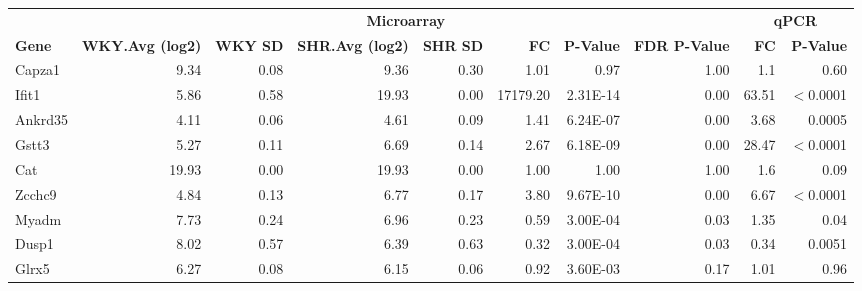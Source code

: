 \begin{sidewaystable}[!htbp]
\scriptsize
\centering
\begin{tabular}{lrrrrrrr|rr}
\textbf{}            & \multicolumn{7}{c}{\textbf{Microarray}}                                                                                                             & \multicolumn{2}{c}{\textbf{qPCR}}\\
\textbf{Gene} & \textbf{WKY.Avg (log2)} & \textbf{WKY SD} & \textbf{SHR.Avg (log2)} & \textbf{SHR SD} & \textbf{FC} & \textbf{P-Value} & \textbf{FDR P-Value}  & \textbf{FC}  & \textbf{P-Value}\\
\hline
Capza1               & 9.34                    & 0.08            & 9.36                    & 0.30            & 1.01                 & 0.97           & 1.00                & 1.1   & 0.60 \\
Ifit1                & 5.86                    & 0.58            & 19.93                   & 0.00            & 17179.20             & 2.31E-14       & 0.00                & 63.51 & $<$0.0001 \\
Ankrd35              & 4.11                    & 0.06            & 4.61                    & 0.09            & 1.41                 & 6.24E-07       & 0.00                & 3.68  & 0.0005\\
Gstt3                & 5.27                    & 0.11            & 6.69                    & 0.14            & 2.67                 & 6.18E-09       & 0.00                & 28.47 & $<$0.0001\\
Cat                  & 19.93                   & 0.00            & 19.93                   & 0.00            & 1.00                 & 1.00           & 1.00                & 1.6   & 0.09\\
Zcchc9               & 4.84                    & 0.13            & 6.77                    & 0.17            & 3.80                 & 9.67E-10       & 0.00                & 6.67  & $<$0.0001\\
\hline
Myadm                & 7.73                    & 0.24            & 6.96                    & 0.23            & 0.59                 & 3.00E-04       & 0.03                & 1.35  & 0.04\\
Dusp1                & 8.02                    & 0.57            & 6.39                    & 0.63            & 0.32                 & 3.00E-04       & 0.03                & 0.34  & 0.0051\\
Glrx5                & 6.27                    & 0.08            & 6.15                    & 0.06            & 0.92                 & 3.60E-03       & 0.17                & 1.01  & 0.96\\

\end{tabular}
\end{sidewaystable}
